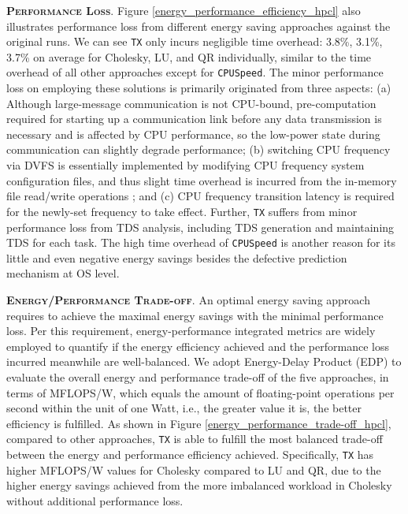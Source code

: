 \documentclass[12pt]{elsarticle}
\begin{document}
\vspace{1mm}
\noindent\textsc{\textbf{Performance Loss}}. Figure \ref{energy_performance_efficiency_hpcl} also illustrates performance loss from different energy saving approaches against the original runs. We can see \texttt{TX} only incurs negligible time overhead: 3.8\%, 3.1\%, 3.7\% on average for Cholesky, LU, and QR individually, similar to the time overhead of all other approaches except for \texttt{CPUSpeed}. The minor performance loss on employing these solutions is primarily originated from three aspects: (a) Although large-message communication is not CPU-bound, pre-computation required for starting up a communication link before any data transmission is necessary and is affected by CPU performance, so the low-power state during communication can slightly degrade performance; (b) switching CPU frequency via DVFS is essentially implemented by modifying CPU frequency system configuration files, and thus slight time overhead is incurred from the in-memory file read/write operations \cite{iccs14}; and (c) CPU frequency transition latency is required for the newly-set frequency to take effect. Further, \texttt{TX} suffers from minor performance loss from TDS analysis, including TDS generation and maintaining TDS for each task. The high time overhead of \texttt{CPUSpeed} is another reason for its little and even negative energy savings besides the defective prediction mechanism at OS level.

\vspace{1mm}
\noindent\textsc{\textbf{Energy/Performance Trade-off}}. An optimal energy saving approach requires to achieve the maximal energy savings with the minimal performance loss. Per this requirement, energy-performance integrated metrics are widely employed to quantify if the energy efficiency achieved and the performance loss incurred meanwhile are well-balanced. We adopt Energy-Delay Product (EDP) to evaluate the overall energy and performance trade-off of the five approaches, in terms of MFLOPS/W, which equals the amount of floating-point operations per second within the unit of one Watt, i.e., the greater value it is, the better efficiency is fulfilled. As shown in Figure \ref{energy_performance_trade-off_hpcl}, compared to other approaches, \texttt{TX} is able to fulfill the most balanced trade-off between the energy and performance efficiency achieved. Specifically, \texttt{TX} has higher MFLOPS/W values for Cholesky compared to LU and QR, due to the higher energy savings achieved from the more imbalanced workload in Cholesky without additional performance loss.
\end{document}
